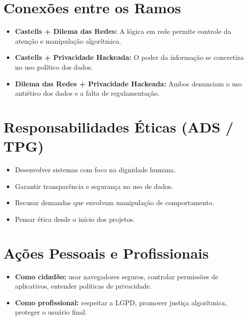 \documentclass[a4paper,12pt]{article}
\begin{document}
\vspace{1cm}

\section*{Conexões entre os Ramos}
\begin{itemize}
  \item \textbf{Castells + Dilema das Redes:} A lógica em rede permite controle da atenção e manipulação algorítmica.
  \item \textbf{Castells + Privacidade Hackeada:} O poder da informação se concretiza no uso político dos dados.
  \item \textbf{Dilema das Redes + Privacidade Hackeada:} Ambos denunciam o uso antiético dos dados e a falta de regulamentação.
\end{itemize}

\section*{Responsabilidades Éticas (ADS / TPG)}
\begin{itemize}
  \item Desenvolver sistemas com foco na dignidade humana.
  \item Garantir transparência e segurança no uso de dados.
  \item Recusar demandas que envolvam manipulação de comportamento.
  \item Pensar ética desde o início dos projetos.
\end{itemize}

\section*{Ações Pessoais e Profissionais}
\begin{itemize}
  \item \textbf{Como cidadão:} usar navegadores seguros, controlar permissões de aplicativos, entender políticas de privacidade.
  \item \textbf{Como profissional:} respeitar a LGPD, promover justiça algorítmica, proteger o usuário final.
\end{itemize}
\end{document}
